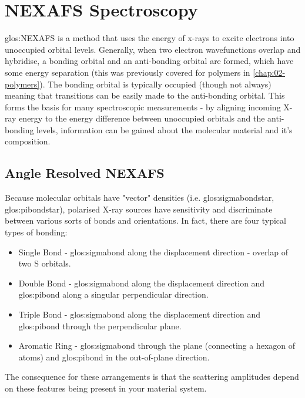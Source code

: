 \documentclass[../main.tex]{subfiles}
\begin{document}
	\chapter{NEXAFS Spectroscopy}\label{chap:04-NEXAFS}
		\gls{glos:NEXAFS} is a method that uses the energy of x-rays to excite electrons into unoccupied orbital levels. Generally, when two electron wavefunctions overlap and hybridise, a bonding orbital and an anti-bonding orbital are formed, which have some energy separation (this was previously covered for polymers in \cref{chap:02-polymers}).
		The bonding orbital is typically occupied (though not always) meaning that transitions can be easily made to the anti-bonding orbital. This forms the basis for many spectroscopic measurements - by aligning incoming X-ray energy to the energy difference between unoccupied orbitals and the anti-bonding levels, information can be gained about the molecular material and it's composition. 
		
	\section{Angle Resolved NEXAFS}\label{sec:04-NEXAFS-AR}
		Because molecular orbitals have "vector" densities (i.e. \gls{glos:sigmabondstar}, \gls{glos:pibondstar}), polarised X-ray sources have sensitivity and discriminate between various sorts of bonds and orientations. 
		In fact, there are four typical types of bonding:
		\begin{itemize}
			\item Single Bond - \gls{glos:sigmabond} along the displacement direction - overlap of two S orbitals.
			\item Double Bond - \gls{glos:sigmabond} along the displacement direction and \gls{glos:pibond} along a singular perpendicular direction.
			\item Triple Bond - \gls{glos:sigmabond} along the displacement direction and \gls{glos:pibond} through the perpendicular plane.
			\item Aromatic Ring - \gls{glos:sigmabond} through the plane (connecting a hexagon of atoms) and \gls{glos:pibond} in the out-of-plane direction.
		\end{itemize}
		The consequence for these arrangements is that the scattering amplitudes depend on these features being present in your material system.
		
		
		
		
		
	\section{}
		
		

\ifSubfilesClassLoaded{
	\printbibliography{}
	\printglossaries
}{} %
	
\end{document}
